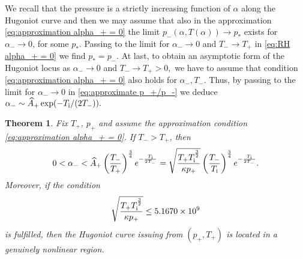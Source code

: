 \documentclass[10pt,a4paper]{article}
\newtheorem{theorem}{Theorem}[section]
\numberwithin{equation}{section}
\newcommand{\Ti}{T_{\rm i}}
\begin{document}
We recall that the pressure is a strictly increasing function of $\alpha$ along the Hugoniot curve \cite[Prop. 5.4]{Asakura-Corli_ionized} and then we may assume that also in the approximation \eqref{eq:approximation alpha_+ = 0} the limit $p_-(\alpha,T(\alpha))\to p_*$ exists for $\alpha_-\to0$, for some $p_*$. Passing to the limit for $\alpha_-\to0$ and $T_-\to T_+$ in \eqref{eq:RH alpha_+ = 0} we find $p_*=p_-$. At last, to obtain an asymptotic form of the Hugoniot locus as $\alpha_- \to 0$ and $T_{-} \to T_{+}>0,$ we have to assume that condition \eqref{eq:approximation alpha_+ = 0} also holds for $\alpha_-, T_{-}$. Thus, by passing to the limit for $\alpha_-\to0$ in \eqref{eq:approximate p_+/p_-} we deduce $\alpha_- \sim \widehat{A}_+\exp(-\Ti/(2T_{-})).$
%
\begin{theorem}\label{thm:GN region}
Fix $T_+$, $p_+$ and assume the approximation condition \eqref{eq:approximation alpha_+ = 0}. If $T_->T_+$, then
\begin{equation}\label{e:alphaless}
0 < \alpha_-  
< \widehat{A}_+ \left(\frac{T_{-}}{T_{+}}\right)^{\frac{3}{4}}e^{-\frac{T_{\rm i}}{2T_{-}}} 
= \sqrt{\frac{T_{+}T_{\rm i}^{\frac{3}{2}}}{\kappa p_{+} }}\left(\frac{T_{-}}{T_{\rm i}}\right)^{\frac{3}{4}}e^{-\frac{T_{\rm i}}{2T_{-}}}.
\end{equation}
Moreover, if the condition 
\begin{equation}\label{e:asyT}
  \sqrt{\frac{T_{+}T_{\rm i}^{\frac{3}{2}}}{\kappa p_{+} }} \leq 5.1670\times 10^{9}
\end{equation}
is fulfilled, then the Hugoniot curve issuing from $(p_+, T_+)$ is located in a genuinely nonlinear region.
\end{theorem}
\end{document}
